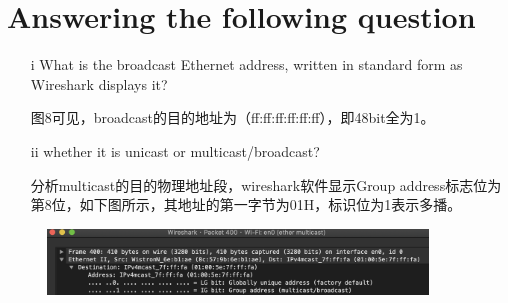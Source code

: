 \documentclass{article}
\begin{document}
\section{Answering the following question}
 \begin{itemize}
 \item[i]What is the broadcast Ethernet address, written in standard form as Wireshark displays it?
 \item[]图8可见，broadcast的目的地址为（ff:ff:ff:ff:ff:ff），即48bit全为1。
 \item[ii]whether it is unicast or multicast/broadcast?
 \item[]分析multicast的目的物理地址段，wireshark软件显示Group address标志位为第8位，如下图所示，其地址的第一字节为01H，标识位为1表示多播。
 \end{itemize}
  \begin{figure}[H]
        \centering
        \includegraphics[width=0.9\textwidth]{img/exp1multi1.png}
        \caption{}
        \label{fig.9}
    \end{figure}



 
\end{document}

